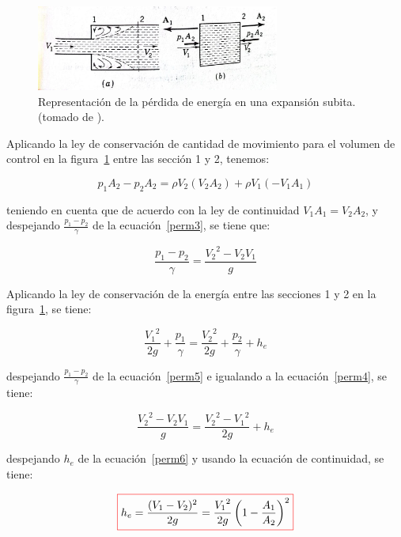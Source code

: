 \documentclass[11pt, oneside]{article}
\begin{document}
\begin{figure}[h]
\centering
\includegraphics[width=8cm]{acce2.jpeg}
\caption{Representaci\'on de la p\'erdida de energ\'ia en una expansi\'on subita. (tomado de \cite{streeter}).}
\label{acce2}
\end{figure}

Aplicando la ley de conservaci\'on de cantidad de movimiento para el volumen de control en la figura~\ref{acce2} entre las secci\'on 1 y 2, tenemos:

\begin{equation}
p_1 A_2 - p_2 A_2 = \rho V_2 (V_2 A_2) + \rho V_1 (-V_1 A_1 )
\label{perm3}
\end{equation}

teniendo en cuenta que de acuerdo con la ley de continuidad $V_1 A_1 = V_2 A_2$, y despejando $\frac{p_1 - p_2}{\gamma}$ de la ecuaci\'on~\ref{perm3}, se tiene que:

\begin{equation}
\frac{p_1 - p_2}{\gamma} =  \frac{{V_2}^2 - V_2 V_1}{g}
\label{perm4}
\end{equation}

Aplicando la ley de conservaci\'on de la energ\'ia entre las secciones 1 y 2 en la figura~\ref{acce2}, se tiene:

\begin{equation}
\frac{{V_1}^2}{2g} + \frac{p_1}{\gamma} = \frac{{V_2}^2}{2g} + \frac{p_2}{\gamma} + h_e
\label{perm5}
\end{equation}

despejando $\frac{p_1 - p_2}{\gamma}$ de la ecuaci\'on~\ref{perm5} e igualando a la ecuaci\'on~\ref{perm4}, se tiene:

\begin{equation}
\frac{{V_2}^2 - V_2 V_1}{g} = \frac{{V_2}^2 - {V_1}^2}{2g} + h_e
\label{perm6}
\end{equation}

despejando $h_e$ de la ecuaci\'on~\ref{perm6} y usando la ecuaci\'on de continuidad, se tiene:

\begin{equation}
\color{red}\boxed{\color{black} h_e = \frac{(V_1 - V_2)^2}{2g} = \frac{{V_1}^2}{2g}\left( 1- \frac{A_1}{A_2} \right)^2 }
\label{perm7}
\end{equation}
\end{document}
